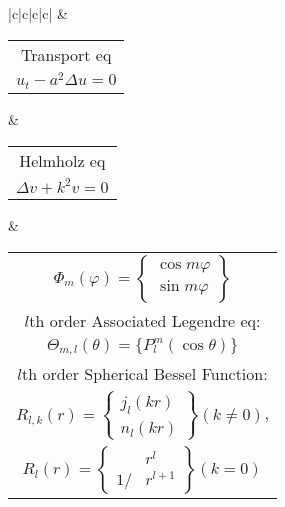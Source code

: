 \documentclass[10pt, a4paper, twocolumn]{article}
\def\Phi{\varPhi}
\def\phi{\varphi}
\begin{document}
\begin{table*}[h]
\begin{tabular}{|c|c|c|c|}
		&  \\ \hline
		
		\begin{tabular}[c]{@{}c@{}}
			Transport eq\\
			$u_{t}-a^2\Delta u=0$
		\end{tabular}

		&  \\ \hline
		
		\begin{tabular}[c]{@{}c@{}}
			Helmholz eq\\
			$\Delta v+k^2v=0$
		\end{tabular}
		
		&

		\begin{tabular}[c]{@{}c@{}}
			$\Phi_m(\phi) = 
			\left\{\begin{aligned}
				\cos m\phi\\
				\sin m\phi
			\end{aligned}\right\}$
			\\
			$l$th order Associated Legendre eq:
			\\
			$\Theta_{m,l}(\theta) = \{P^m_l(\cos\theta)\}$
			\\
			$l$th order Spherical Bessel Function: 
			\\
			$R_{l,k}(r) = 
			\left\{\begin{aligned}
				j_l(kr)\\
				n_l(kr)
			\end{aligned}\right\}(k\neq 0)$,
			\\
			$R_l(r) = \left\{\begin{aligned}
				&r^l\\
				1/&r^{l+1}
			\end{aligned}\right\}(k = 0)$
		\end{tabular}


\end{tabular}
\end{table*}
\end{document}
